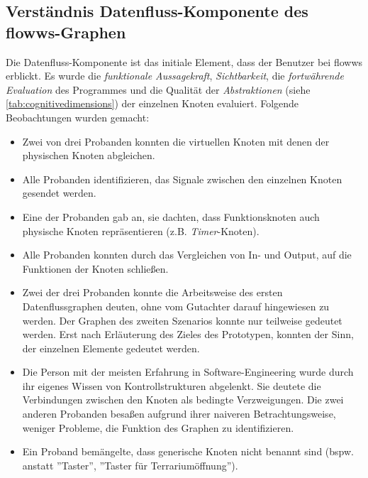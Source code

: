 \subsection*{Verständnis Datenfluss-Komponente des flowws-Graphen}
Die Datenfluss-Kom\-po\-nen\-te ist das initiale Element, dass der Benutzer bei flowws erblickt. Es wurde die \textit{funktionale Aussagekraft}, \textit{Sichtbarkeit}, die \textit{fortwährende Evaluation} des Programmes und die Qualität der \textit{Abstraktionen} (siehe \ref{tab:cognitivedimensions}) der einzelnen Knoten evaluiert. Folgende Beobachtungen wurden gemacht: 
\begin{itemize}
    \item Zwei von drei Probanden konnten die virtuellen Knoten mit denen der physischen Knoten abgleichen.
    \item Alle Probanden identifizieren, das Signale zwischen den einzelnen Knoten gesendet werden.
    \item Eine der Probanden gab an, sie dachten, dass Funktionsknoten auch physische Knoten repräsentieren (z.B. \textit{Timer}-Knoten).
    \item Alle Probanden konnten durch das Vergleichen von In- und Output, auf die Funktionen der Knoten schließen.
    \item Zwei der drei Probanden konnte die Arbeitsweise des ersten Datenflussgraphen deuten, ohne vom Gutachter darauf hingewiesen zu werden. Der Graphen des zweiten Szenarios konnte nur teilweise gedeutet werden. Erst nach Erläuterung des Zieles des Prototypen, konnten der Sinn, der einzelnen Elemente gedeutet werden. 
    \item Die Person mit der meisten Erfahrung in Software-Engineering wurde durch ihr eigenes Wissen von Kontrollstrukturen abgelenkt. Sie deutete die Verbindungen zwischen den Knoten als bedingte Verzweigungen. Die zwei anderen Probanden besaßen aufgrund ihrer naiveren Betrachtungsweise, weniger Probleme, die Funktion des Graphen zu identifizieren.
    \item Ein Proband bemängelte, dass generische Knoten nicht benannt sind (bspw. anstatt ''Taster'', ''Taster für Terrariumöffnung'').
\end{itemize}

